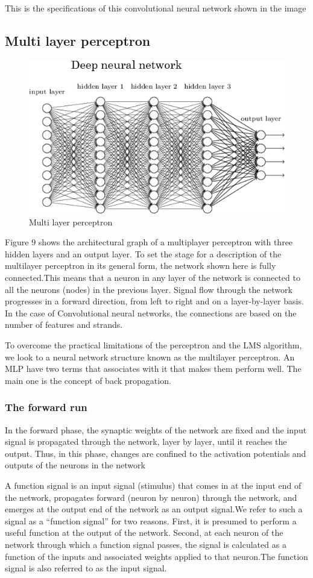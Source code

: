 \documentclass[12pt]{article}
\begin{document}
     This is the specifications of this convolutional neural network shown in the image
     \subsection{Multi layer perceptron}
     \begin{figure}[h]
    	\centering
    	\includegraphics[width=0.55 \textwidth]{h.png}
    	\caption{Multi layer perceptron}
    	\label{fig:mesh9}
    	
	\end{figure}   
     
     
     Figure 9 shows the architectural graph of a multiplayer perceptron with three hidden
layers and an output layer. To set the stage for a description of the multilayer perceptron
in its general form, the network shown here is fully connected.This means that a neuron
in any layer of the network is connected to all the neurons (nodes) in the previous
layer. Signal flow through the network progresses in a forward direction, from left to right
and on a layer-by-layer basis. In the case of Convolutional neural networks, the connections are based on the number of features and strands. 

To overcome
the practical limitations of the perceptron and the LMS algorithm, we look to a neural
network structure known as the multilayer perceptron. An MLP have two terms that associates with it that makes them perform well. The main one is the concept of back propagation.
    \subsubsection{The forward run}
    In the forward phase, the synaptic weights of the network are fixed and the input signal is propagated through the network, layer by layer, until it reaches the output.
Thus, in this phase, changes are confined to the activation potentials and outputs of the neurons in the network

A function signal is an input signal (stimulus) that comes in at the input end of the network, propagates forward (neuron by neuron) through the network, and emerges at the output end of the network as an output signal.We refer to such a signal as a “function signal” for two reasons. First, it is presumed to
perform a useful function at the output of the network. Second, at each neuron of the network through which a function signal passes, the signal is calculated as a function of the inputs and associated weights applied to that neuron.The function signal is also referred to as the input signal.
\end{document}
